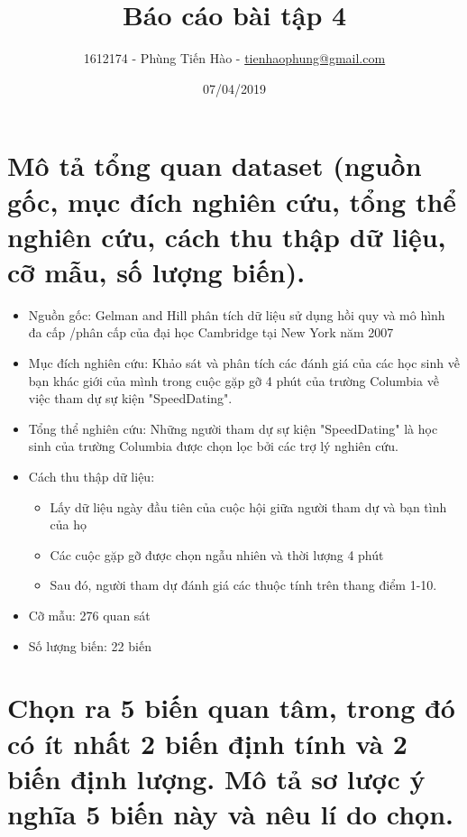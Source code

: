 \documentclass[a4paper,12pt]{article}
\title{Báo cáo bài tập 4}
\author{1612174 - Phùng Tiến Hào - \href{mailto:tienhaophung@gmail.com}{tienhaophung@gmail.com}}
\date{07/04/2019}
\begin{document}
	\maketitle
	\newpage
	
	\doublespacing
	\tableofcontents
	\singlespace
	
	\newpage
	
	\section{Mô tả tổng quan dataset (nguồn gốc, mục đích nghiên cứu, tổng thể nghiên cứu, cách thu thập dữ liệu, cỡ mẫu, số lượng biến).}
	\begin{itemize}
		\item Nguồn gốc:
		Gelman and Hill phân tích dữ liệu sử dụng hồi quy và mô hình đa cấp /phân cấp của đại học Cambridge tại New York năm 2007
		
		\item Mục đích nghiên cứu:
		Khảo sát và phân tích các đánh giá của các học sinh về bạn khác giới của mình trong cuộc gặp gỡ 4 phút của trường Columbia 
		về việc tham dự sự kiện "SpeedDating".
		
		\item Tổng thể nghiên cứu:
		Những người tham dự sự kiện "SpeedDating" là học sinh của trường Columbia được chọn lọc bởi các trợ lý nghiên cứu.
		
		\item Cách thu thập dữ liệu:
		\begin{itemize}
			\item Lấy dữ liệu ngày đầu tiên của cuộc hội giữa người tham dự và bạn tình của họ
			\item Các cuộc gặp gỡ được chọn ngẫu nhiên và thời lượng 4 phút
			\item Sau đó, người tham dự đánh giá các thuộc tính trên thang điểm 1-10.
		\end{itemize}
		
		\item Cỡ mẫu: 276 quan sát
		\item Số lượng biến: 22 biến
		
	\end{itemize}
		
		
		
		
	\section{Chọn ra 5 biến quan tâm, trong đó có ít nhất 2 biến định tính và 2 biến định lượng. Mô tả sơ
		lược ý nghĩa 5 biến này và nêu lí do chọn.}
		
\end{document}
